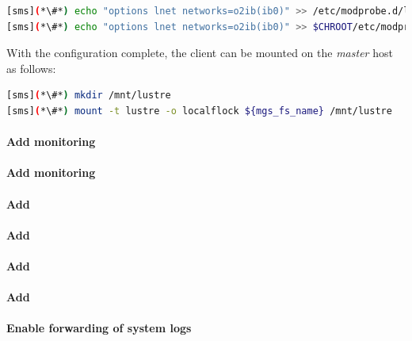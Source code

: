 \documentclass[letterpaper]{article}
\begin{document}
\begin{lstlisting}[language=bash,keywords={},upquote=true]
[sms](*\#*) echo "options lnet networks=o2ib(ib0)" >> /etc/modprobe.d/lustre.conf
[sms](*\#*) echo "options lnet networks=o2ib(ib0)" >> $CHROOT/etc/modprobe.d/lustre.conf
\end{lstlisting}

With the \Lustre{} configuration complete, the client can be mounted on the {\em master}
host as follows:
\begin{lstlisting}[language=bash,keywords={},upquote=true]
[sms](*\#*) mkdir /mnt/lustre
[sms](*\#*) mount -t lustre -o localflock ${mgs_fs_name} /mnt/lustre
\end{lstlisting}

\paragraph{Add \Nagios{} monitoring}


\clearpage
\paragraph{Add \Ganglia{} monitoring}


\paragraph{Add \clustershell{}}


\paragraph{Add \mrsh{}}


\paragraph{Add \genders{}}


\paragraph{Add \powerman{}}


\paragraph{Enable forwarding of system logs} \label{sec:add_syslog}

\end{document}

